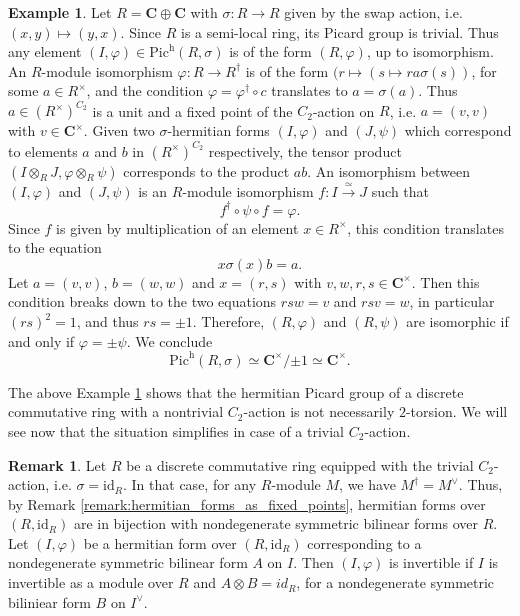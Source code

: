 \documentclass{article}
\theoremstyle{definition}
\newtheorem{remark}[equation]{Remark}
\newtheorem{example}[equation]{Example}
\begin{document}
\begin{example}
    \label{example:hermitian_picard_group_is_not_2-torsion-swap_action_on_fields}
    Let $R=\mathbf{C}\oplus \mathbf{C}$ with $\sigma:R\rightarrow R$ given by the swap action, i.e. $(x,y)\mapsto (y,x)$. Since $R$ is a semi-local ring, its Picard group is trivial. Thus any element $(I,\varphi)\in \text{Pic}^\text{h}(R,\sigma)$ is of the form $(R,\varphi)$, up to isomorphism. An $R$-module isomorphism $\varphi:R\rightarrow R^\dagger$ is of the form $(r\mapsto (s\mapsto ra\sigma(s))$, for some $a\in R^\times$, and the condition $\varphi=\varphi^\dagger \circ c$ translates to $a=\sigma(a)$. Thus $a\in (R^\times)^{C_2}$ is a unit and a fixed point of the $C_2$-action on $R$, i.e. $a=(v,v)$ with $v\in \mathbf{C}^\times$. Given two $\sigma$-hermitian forms $(I,\varphi)$ and $(J,\psi)$ which correspond to elements $a$ and $b$ in $(R^\times)^{C_2}$ respectively, the tensor product $(I\otimes_R J,\varphi\otimes_R \psi)$ corresponds to the product $ab$. An isomorphism between  $(I,\varphi)$ and $(J,\psi)$ is an $R$-module isomorphism $f:I\xrightarrow{\simeq} J$ such that $$f^\dagger\circ\psi\circ f=\varphi.$$ Since $f$ is given by multiplication of an element $x\in R^\times$, this condition translates to the equation $$x\sigma(x)b=a.$$ Let $a=(v,v)$, $b=(w,w)$ and $x=(r,s)$ with $v,w,r,s\in \mathbf{C}^\times$. Then this condition breaks down to the two equations $rsw=v$ and $rsv=w$, in particular $(rs)^2=1$, and thus $rs=\pm 1$. Therefore, $(R,\varphi)$ and $(R,\psi)$ are isomorphic if and only if $\varphi=\pm\psi$. We conclude $$\text{Pic}^\text{h}(R,\sigma)\simeq \mathbf{C}^\times/{\pm 1}\simeq \mathbf{C}^\times.$$
\end{example}

The above Example \ref{example:hermitian_picard_group_is_not_2-torsion-swap_action_on_fields} shows that the hermitian Picard group of a discrete commutative ring with a nontrivial $C_2$-action is not necessarily $2$-torsion. We will see now that the situation simplifies in case of a trivial $C_2$-action.

\begin{remark}
    \label{remark:id-hermitian_forms_are_symmetric_billinear_forms}
    Let $R$ be a discrete commutative ring equipped with the trivial $C_2$-action, i.e. $\sigma=\text{id}_R$. In that case, for any $R$-module $M$, we have $M^\dagger=M^\vee$. Thus, by Remark \ref{remark:hermitian_forms_as_fixed_points}, hermitian forms over $(R,\text{id}_R)$ are in bijection with nondegenerate symmetric bilinear forms over $R$. Let $(I,\varphi)$ be a hermitian form over $(R,\text{id}_R)$ corresponding to a nondegenerate symmetric bilinear form $A$ on $I$. Then $(I,\varphi)$ is invertible if $I$ is invertible as a module over $R$ and $A\otimes B=id_R$, for a nondegenerate symmetric biliniear form $B$ on $I^\vee$.
\end{remark}
\end{document}
